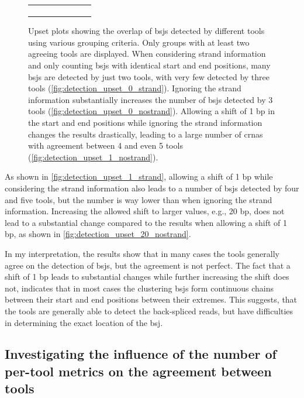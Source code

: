 \begin{figure}[ht]
\begin{tabular}{cc}
{\begin{subfigure}{\textwidth}
                       \end{subfigure}}\end{tabular} \caption{Upset plots
        showing the overlap of
        \gls{bsj}s detected by different tools using various grouping criteria.
        Only groups with at least two agreeing tools are displayed.
        When considering strand information and only counting \gls{bsj}s with identical
        start and end positions, many \gls{bsj}s are detected by just two tools, with
        very few detected by three tools (\cref{fig:detection_upset_0_strand}).
        Ignoring the strand information substantially increases the number of
        \gls{bsj}s detected by 3 tools (\cref{fig:detection_upset_0_nostrand}).
        Allowing a shift of 1 bp in the start and end positions while ignoring the
        strand information changes the results drastically, leading to a large number
        of \gls{crna}s with agreement between 4 and even 5 tools
        (\cref{fig:detection_upset_1_nostrand}).
    }
    \label{fig:detection_upset}
\end{figure}

As shown in \cref{fig:detection_upset_1_strand}, allowing a shift of 1 bp while
considering the strand information also leads to a number of \gls{bsj}s
detected by four and five tools, but the number is way lower than when ignoring
the strand information.
Increasing the allowed shift to larger values, e.g., 20 bp, does not lead to a
substantial change compared to the results when allowing a shift of 1 bp, as
shown in \cref{fig:detection_upset_20_nostrand}.

In my interpretation, the results show that in many cases the tools generally
agree on the detection of \gls{bsj}s, but the agreement is not perfect.
The fact that a shift of 1 bp leads to substantial changes while further
increasing the shift does not, indicates that in most cases the clustering
\gls{bsj}s form continuous chains between their start and end positions between
their extremes.
This suggests, that the tools are generally able to detect the back-spliced
reads, but have difficulties in determining the exact location of the
\gls{bsj}.

\subsection{Investigating the influence of the number of per-tool metrics on the
    agreement between tools}


